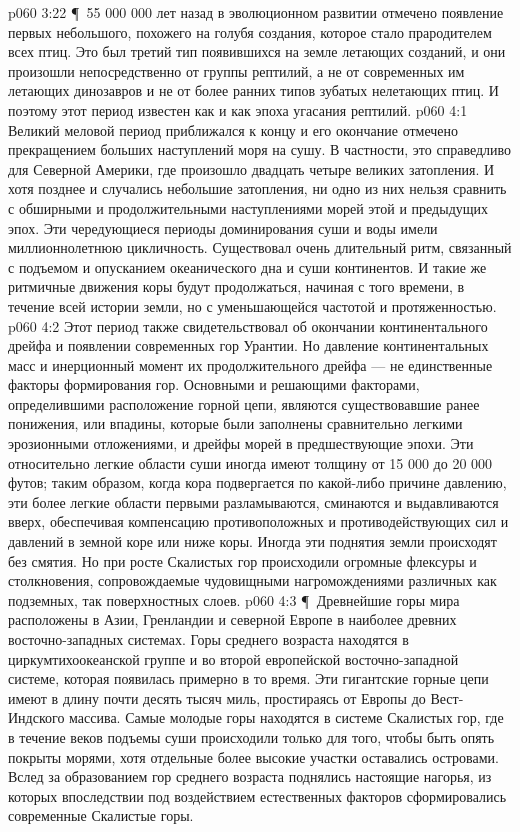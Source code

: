 \vs p060 3:22 \P\ 55 000 000 лет назад в эволюционном развитии отмечено  появление первых  небольшого, похожего на голубя создания, которое стало прародителем всех птиц. Это был третий тип появившихся на земле летающих созданий, и они произошли непосредственно от группы рептилий, а не от современных им летающих динозавров и не от более ранних типов зубатых нелетающих птиц. И поэтому этот период известен как  и как эпоха угасания рептилий.
\vs p060 4:1 Великий меловой период приближался к концу и его окончание отмечено прекращением больших наступлений моря на сушу. В частности, это справедливо для Северной Америки, где произошло двадцать четыре великих затопления. И хотя позднее и случались небольшие затопления, ни одно из них нельзя сравнить с обширными и продолжительными наступлениями морей этой и предыдущих эпох. Эти чередующиеся периоды доминирования суши и воды имели миллионнолетнюю цикличность. Существовал очень длительный ритм, связанный с подъемом и опусканием океанического дна и суши континентов. И такие же ритмичные движения коры будут продолжаться, начиная с того времени, в течение всей истории земли, но с уменьшающейся частотой и протяженностью.
\vs p060 4:2 Этот период также свидетельствовал об окончании континентального дрейфа и появлении современных гор Урантии. Но давление континентальных масс и инерционный момент их продолжительного дрейфа --- не единственные факторы формирования гор. Основными и решающими факторами, определившими расположение горной цепи, являются существовавшие ранее понижения, или впадины, которые были заполнены сравнительно легкими эрозионными отложениями, и дрейфы морей в предшествующие эпохи. Эти относительно легкие области суши иногда имеют толщину от 15 000 до 20 000 футов; таким образом, когда кора подвергается по какой\hyp{}либо причине давлению, эти более легкие области первыми разламываются, сминаются и выдавливаются вверх, обеспечивая компенсацию противоположных и противодействующих сил и давлений в земной коре или ниже коры. Иногда эти поднятия земли происходят без смятия. Но при росте Скалистых гор происходили огромные флексуры и столкновения, сопровождаемые чудовищными нагромождениями различных как подземных, так поверхностных слоев.
\vs p060 4:3 \P\ Древнейшие горы мира расположены в Азии, Гренландии и северной Европе в наиболее древних восточно\hyp{}западных системах. Горы среднего возраста находятся в циркумтихоокеанской группе и во второй европейской восточно\hyp{}западной системе, которая появилась примерно в то время. Эти гигантские горные цепи имеют в длину почти десять тысяч миль, простираясь от Европы до Вест\hyp{}Индского массива. Самые молодые горы находятся в системе Скалистых гор, где в течение веков подъемы суши происходили только для того, чтобы быть опять покрыты морями, хотя отдельные более высокие участки оставались островами. Вслед за образованием гор среднего возраста поднялись настоящие нагорья, из которых впоследствии под воздействием естественных факторов сформировались современные Скалистые горы.
